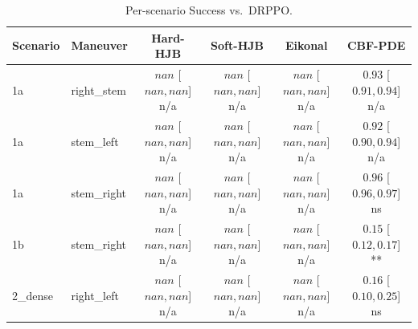 \begin{table}[ht]
\centering
\caption{Per-scenario Success vs.\ DRPPO.}
\label{tab:per_scenario_success_rate}
\begin{tabular}{llcccc}
\toprule
Scenario & Maneuver & Hard-HJB & Soft-HJB & Eikonal & CBF-PDE \\
\midrule
1a & right_stem & $nan$ [$nan, nan$] n/a & $nan$ [$nan, nan$] n/a & $nan$ [$nan, nan$] n/a & $0.93$ [$0.91, 0.94$] n/a \\
1a & stem_left & $nan$ [$nan, nan$] n/a & $nan$ [$nan, nan$] n/a & $nan$ [$nan, nan$] n/a & $0.92$ [$0.90, 0.94$] n/a \\
1a & stem_right & $nan$ [$nan, nan$] n/a & $nan$ [$nan, nan$] n/a & $nan$ [$nan, nan$] n/a & $0.96$ [$0.96, 0.97$] ns \\
1b & stem_right & $nan$ [$nan, nan$] n/a & $nan$ [$nan, nan$] n/a & $nan$ [$nan, nan$] n/a & $0.15$ [$0.12, 0.17$] ** \\
2_dense & right_left & $nan$ [$nan, nan$] n/a & $nan$ [$nan, nan$] n/a & $nan$ [$nan, nan$] n/a & $0.16$ [$0.10, 0.25$] ns \\
\bottomrule
\end{tabular}
\end{table}
